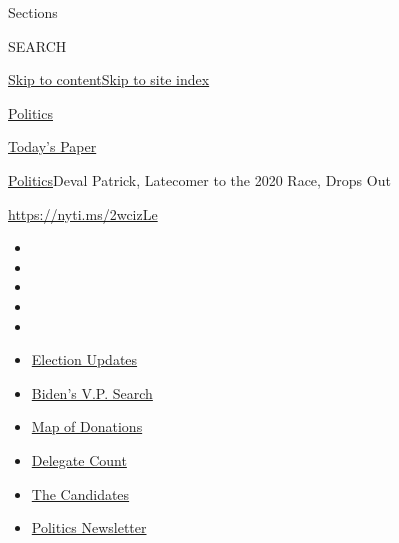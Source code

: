 Sections

SEARCH

\protect\hyperlink{site-content}{Skip to
content}\protect\hyperlink{site-index}{Skip to site index}

\href{https://www.nytimes.com/section/politics}{Politics}

\href{https://myaccount.nytimes.com/auth/login?response_type=cookie\&client_id=vi}{}

\href{https://www.nytimes.com/section/todayspaper}{Today's Paper}

\href{/section/politics}{Politics}\textbar{}Deval Patrick, Latecomer to
the 2020 Race, Drops Out

\url{https://nyti.ms/2wcizLe}

\begin{itemize}
\item
\item
\item
\item
\item
\end{itemize}

\begin{itemize}
\item
  \href{https://www.nytimes.com/2020/07/31/us/elections/biden-vs-trump.html?action=click\&pgtype=Article\&state=default\&region=TOP_BANNER\&context=storylines_menu}{Election
  Updates}
\item
  \href{https://www.nytimes.com/article/biden-vice-president-2020.html?action=click\&pgtype=Article\&state=default\&region=TOP_BANNER\&context=storylines_menu}{Biden's
  V.P. Search}
\item
  \href{https://www.nytimes.com/interactive/2020/07/24/us/politics/trump-biden-campaign-donors.html?action=click\&pgtype=Article\&state=default\&region=TOP_BANNER\&context=storylines_menu}{Map
  of Donations}
\item
  \href{https://www.nytimes.com/interactive/2020/us/elections/delegate-count-primary-results.html?action=click\&pgtype=Article\&state=default\&region=TOP_BANNER\&context=storylines_menu}{Delegate
  Count}
\item
  \href{https://www.nytimes.com/interactive/2019/us/politics/2020-presidential-candidates.html?action=click\&pgtype=Article\&state=default\&region=TOP_BANNER\&context=storylines_menu}{The
  Candidates}
\item
  \href{https://www.nytimes.com/newsletters/politics?action=click\&pgtype=Article\&state=default\&region=TOP_BANNER\&context=storylines_menu}{Politics
  Newsletter}
\end{itemize}

